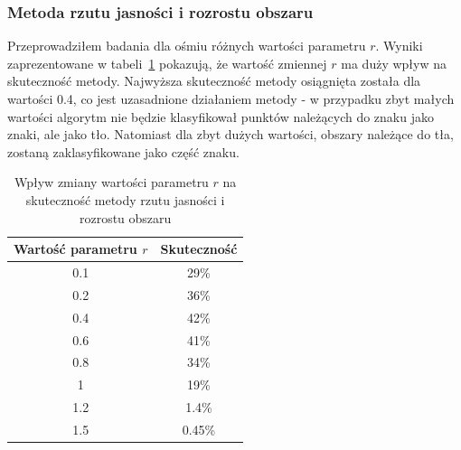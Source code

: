 \subsubsection{Metoda rzutu jasności i rozrostu obszaru}
Przeprowadziłem badania dla ośmiu różnych wartości parametru $r$. Wyniki zaprezentowane w tabeli~\ref{tab:rzut_jasnosci_rozrost_obszaru} pokazują, że wartość zmiennej $r$ ma duży wpływ na skuteczność metody. Najwyższa skuteczność metody osiągnięta została dla wartości 0.4, co jest uzasadnione działaniem metody - w przypadku zbyt małych wartości algorytm nie będzie klasyfikował punktów należących do znaku jako znaki, ale jako tło. Natomiast dla zbyt dużych wartości, obszary należące do tła, zostaną zaklasyfikowane jako część znaku. 
\begin {table}[H]
  \begin{center}
    \begin{tabular}{c | c}
      Wartość parametru $r$ & Skuteczność \\
      \hline
      0.1 & 29\% \\
      0.2 & 36\% \\
      0.4 & 42\% \\
      0.6 & 41\% \\
      0.8 & 34\% \\
      1 & 19\% \\
      1.2 & 1.4\%\\
      1.5 & 0.45\%
    \end{tabular}
    \caption {Wpływ zmiany wartości parametru $r$ na skuteczność metody rzutu jasności i rozrostu obszaru}
    \label{tab:rzut_jasnosci_rozrost_obszaru} 
  \end{center}
\end {table}

